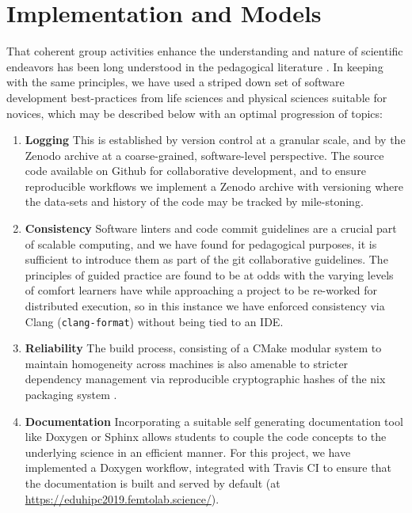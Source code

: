 \documentclass[conference]{IEEEtran}
\begin{document}
\section{Implementation and Models}
That coherent group activities enhance the understanding and nature of scientific endeavors has been long understood in the pedagogical literature \cite{weirSmallChangesBig2019,bransfordHowPeopleLearn2000}. In keeping with the same principles, we have used a striped down set of software development best-practices from life sciences and physical sciences \cite{crouchSoftwareSustainabilityInstitute2013,altschulAnatomySuccessfulComputational2013,goswamiDSEAMSDeferredStructural2019,goswamiSpaceFillingCurves2019} suitable for novices, which may be described below with an optimal progression of topics:
\begin{enumerate}
	\item \textbf{Logging} This is established by version control at a granular scale, and by the Zenodo archive at a coarse-grained, software-level perspective. The source code available on Github \cite{DgFemtoLabEduhipc20192019} for collaborative development, and to ensure reproducible workflows we implement a Zenodo archive \cite{rohit_goswami_2019_3478181} with versioning where the data-sets and history of the code may be tracked by mile-stoning.
	\item \textbf{Consistency} Software linters and code commit guidelines are a crucial part of scalable computing, and we have found for pedagogical purposes, it is sufficient to introduce them as part of the git collaborative guidelines. The principles of guided practice are found to be at odds with the varying levels of comfort learners have while approaching a project to be re-worked for distributed execution, so in this instance we have enforced consistency via Clang (\texttt{clang-format}) without being tied to an IDE.
	\item \textbf{Reliability} The build process, consisting of a CMake modular system to maintain homogeneity across machines is also amenable to stricter dependency management via reproducible cryptographic hashes of the nix packaging system \cite{dolstraNixSafePolicyFree2004}.
	\item \textbf{Documentation} Incorporating a suitable self generating documentation tool like Doxygen or Sphinx allows students to couple the code concepts to the underlying science in an efficient manner. For this project, we have implemented a Doxygen workflow, integrated with Travis CI to ensure that the documentation is built and served by default (at \href{https://eduhipc2019.femtolab.science/}{https://eduhipc2019.femtolab.science/}).
\end{enumerate}
\end{document}
